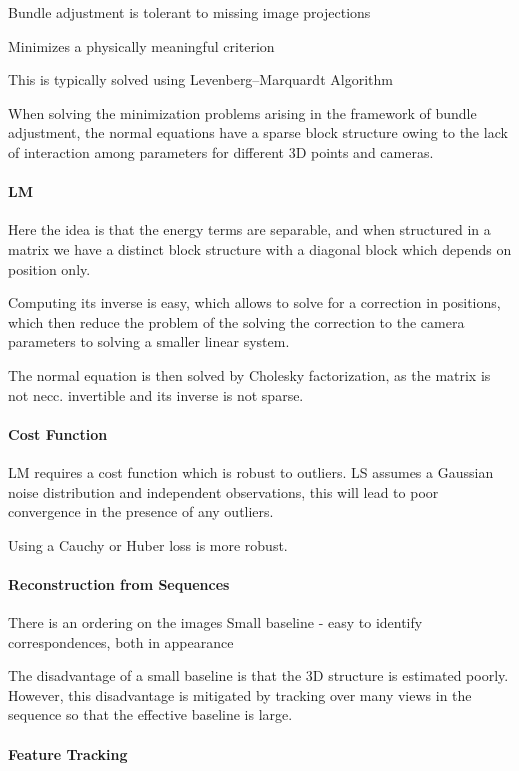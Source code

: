 Bundle adjustment is tolerant to missing image projections 

Minimizes a physically meaningful criterion

This is typically solved using Levenberg–Marquardt Algorithm

When solving the minimization problems arising in the framework of bundle adjustment, the normal equations have a sparse block structure owing to the lack of interaction among parameters for different 3D points and cameras.

\paragraph{LM}

Here the idea is that the energy terms are separable, and when structured in a matrix we have a distinct block structure with a diagonal block which depends on position only. 

Computing its inverse is easy, which allows to solve for a correction in positions, which then reduce the problem of the solving the correction to the camera parameters to solving a smaller linear system.

The normal equation is then solved by Cholesky factorization, as the matrix is not necc. invertible and its inverse is not sparse.

\paragraph{Cost Function}
LM requires a cost function which is robust to outliers. 
LS assumes a Gaussian noise distribution and independent observations, this will lead to poor convergence in the presence of any outliers. 

Using a Cauchy or Huber loss is more robust.

\paragraph{Reconstruction from Sequences}

There is an ordering on the images
Small baseline - easy to identify correspondences, both in appearance 

The disadvantage of a small baseline is that the 3D structure is estimated poorly. However, this disadvantage is mitigated by tracking over many views in the sequence so that the effective baseline is large.


\paragraph{Feature Tracking}

